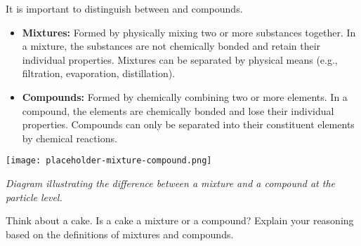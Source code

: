 It is important to distinguish between  and compounds.

\begin{itemize}
    \item \textbf{Mixtures:}  Formed by physically mixing two or more substances together.  In a mixture, the substances are not chemically bonded and retain their individual properties. Mixtures can be separated by physical means (e.g., filtration, evaporation, distillation). 
    \item \textbf{Compounds:} Formed by chemically combining two or more elements. In a compound, the elements are chemically bonded and lose their individual properties. Compounds can only be separated into their constituent elements by chemical reactions. 
\end{itemize}

\begin{marginfigure}
\texttt{[image: placeholder-mixture-compound.png]}
\caption*{\textit{Diagram illustrating the difference between a mixture and a compound at the particle level.}}
\end{marginfigure}

\begin{stopandthink}
Think about a cake. Is a cake a mixture or a compound? Explain your reasoning based on the definitions of mixtures and compounds.
\end{stopandthink}


